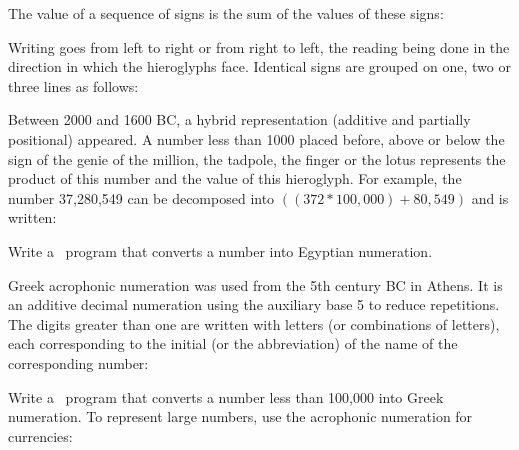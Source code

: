 \begin{exercices}
{\noindent The value of a sequence of signs is the sum of the values
of these signs:\par\nopagebreak
\noindent\begin{minipage}[b][3.07cm]{\textwidth}\vfill{}\end{minipage}\par

\noindent Writing goes from left to right or from right to left, the
reading being done in the direction in which the hieroglyphs face.
Identical signs are grouped on one, two or three lines
as follows:\par\nopagebreak
\noindent\begin{minipage}[b][1.89cm]{\textwidth}\vfill{}\end{minipage}\par

\noindent  Between 2000 and 1600 BC, a hybrid representation (additive and partially
positional) appeared. A number less than 1000 placed before, above or below
the sign of the genie of the million, the tadpole, the finger or the lotus represents the product of this number and the
value of this hieroglyph. For example, the number 37,280,549 can be decomposed into
$((372 \ast 100{,}000) + 80{,}549)$ and is written:\par\nopagebreak
\noindent\begin{minipage}[b][3.10cm]{\textwidth}\vfill{}\end{minipage}\par

\noindent Write a \python\ program that converts a number into E\-gyp\-tian
nu\-mer\-a\-tion.

\tiret Greek acrophonic numeration \cite{guitel} was used from
the 5th
century BC in Athens. It is an additive decimal numeration using the auxiliary
base 5 to reduce repetitions. The digits greater
than one are written with
letters (or combinations of letters),
each corresponding to the initial (or the abbreviation) of the name of the
corresponding number:\par\nopagebreak
\noindent\begin{minipage}[b][2.40cm]{\textwidth}\vfill{}\end{minipage}\par

Write a \python\ program that converts a number less than 100,000 into Greek
nu\-mer\-a\-tion.
To represent large numbers, use the acrophonic numeration
for currencies:

}
\end{exercices}
